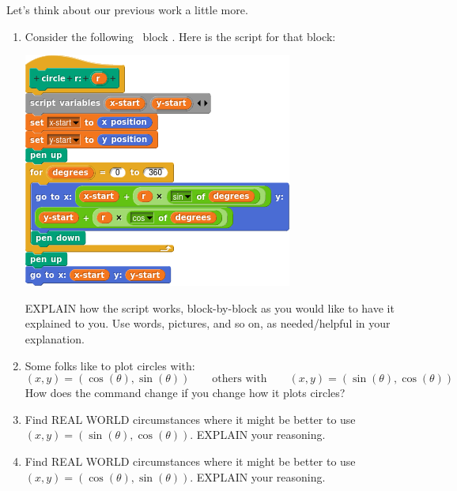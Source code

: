 \documentclass[noauthor,nooutcomes,hints,handout]{ximera}
\begin{document}
\begin{question}
  Let's think about our previous work a little more.
  \begin{enumerate}
  \item Consider the following \snap\ block . Here is the script for that block:
    \begin{center}
      \includegraphics{circleScript.png}
    \end{center}
    EXPLAIN how the script works, block-by-block as you would like to
    have it explained to you. Use words, pictures, and so on, as
    needed/helpful in your explanation.
  \item Some folks like to plot circles with:
    \[
    (x,y) = (\cos(\theta),\sin(\theta)) \qquad\text{others with}\qquad  (x,y) = (\sin(\theta),\cos(\theta))
    \]
    How does the command  change if you change how it plots circles?
  \item Find REAL WORLD circumstances where it might be better to use $(x,y) = (\sin(\theta),\cos(\theta))$. EXPLAIN your reasoning.
  \item Find REAL WORLD circumstances where it might be better to use $(x,y) = (\cos(\theta),\sin(\theta))$. EXPLAIN your reasoning.
  

\end{enumerate}
\end{question}
\end{document}
